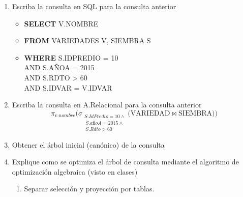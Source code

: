 \documentclass{templateNote}
\begin{document}
\begin{enumerate}
    \begin{enumerate}[label=\alph*)]
        \item Escriba la consulta en SQL para la consulta anterior
        \begin{itemize}
            \item \textbf{SELECT} V.NOMBRE 
            \item \textbf{FROM} VARIEDADES V, SIEMBRA S
            \item \textbf{WHERE} S.IDPREDIO = 10 \\AND S.AÑOA = 2015 \\AND S.RDTO > 60 \\AND S.IDVAR = V.IDVAR
        \end{itemize}
        \item Escriba la consulta en A.Relacional para la consulta anterior
        \begin{equation*}
            \pi_{v.nombre} \Bigg( \sigma_{\substack{
                S.IdPredio = 10 \land \\
                \ S.añoA = 2015 \land \\
                \ S.Rdto > 60      
            }} \big( \text{VARIEDAD}\bowtie \text{SIEMBRA}) )
        \end{equation*}
        \item Obtener el árbol inicial (canónico) de la consulta
        \begin{center}
        \end{center}
        \item Explique como se optimiza el árbol de consulta mediante el algoritmo de optimización algebraica (visto en clases)
        \begin{enumerate}
            \item Separar selección y proyección por tablas.

\end{enumerate}
\end{enumerate}
\end{enumerate}
\end{document}
